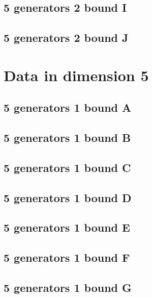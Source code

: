 \documentclass{TC}
\begin{document}
{\subsection{5 generators 2 bound I}

\newpage

\subsection{5 generators 2 bound J} \label{fail1}

\newpage



\section{Data in dimension 5}
\subsection{5 generators 1 bound A}
\newpage

\subsection{5 generators 1 bound B}

\newpage

\subsection{5 generators 1 bound C}

\newpage

\subsection{5 generators 1 bound D}

\newpage

\subsection{5 generators 1 bound E}

\newpage

\subsection{5 generators 1 bound F}
\label{fail3}

\newpage

\subsection{5 generators 1 bound G}

\newpage

}
\end{document}
